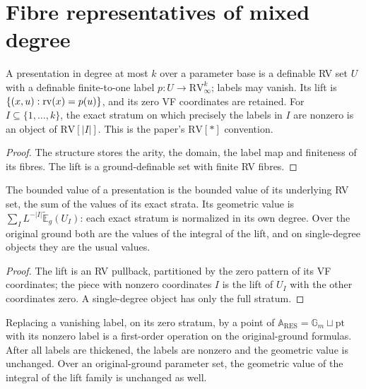 \section{Fibre representatives of mixed degree}

\begin{definition}
\label{weak-objects}
\leanok
{}
A presentation in degree at most $k$ over a parameter base is a definable RV set $U$ with a definable finite-to-one label $p:U\to\mathrm{RV}_\infty^k$; labels may vanish. Its lift is $\{(x,u):\operatorname{rv}(x)=p(u)\}$, and its zero VF coordinates are retained. For $I\subseteq\{1,\ldots,k\}$, the exact stratum on which precisely the labels in $I$ are nonzero is an object of $\mathrm{RV}[|I|]$. This is the paper's $\mathrm{RV}[*]$ convention.
\end{definition}

\begin{proof}
The structure stores the arity, the domain, the label map and finiteness of its fibres. The lift is a ground-definable set with finite RV fibres.
\end{proof}

\begin{definition}
\label{weak-values}
\leanok
{}
The bounded value of a presentation is the bounded value of its underlying RV set, the sum of the values of its exact strata. Its geometric value is $\sum_I L^{-|I|}\widetilde{\mathbb E}_g(U_I)$: each exact stratum is normalized in its own degree. Over the original ground both are the values of the integral of the lift, and on single-degree objects they are the usual values.
\end{definition}

\begin{proof}
The lift is an RV pullback, partitioned by the zero pattern of its VF coordinates; the piece with nonzero coordinates $I$ is the lift of $U_I$ with the other coordinates zero. A single-degree object has only the full stratum.
\end{proof}

\begin{lemma}
\label{thickening}
\leanok
{}
Replacing a vanishing label, on its zero stratum, by a point of $\mathbb A_{\mathrm{RES}}=\mathbb G_m\sqcup\mathrm{pt}$ with its nonzero label is a first-order operation on the original-ground formulas. After all labels are thickened, the labels are nonzero and the geometric value is unchanged. Over an original-ground parameter set, the geometric value of the integral of the lift family is unchanged as well.
\end{lemma}

